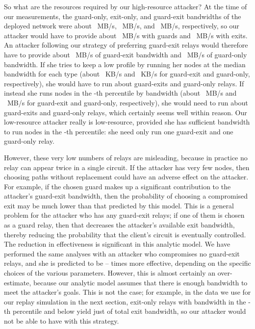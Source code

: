 \documentclass[]{lmcs}
\begin{document}
So what are the resources required by our high-resource attacker?
At the time of our measurements, the guard-only, exit-only, and guard-exit
bandwidths of the deployed
network were about ~MB/s, ~MB/s, and ~MB/s, respectively,
so our
attacker would have to provide about ~MB/s with guards
and ~MB/s with exits.  
An attacker following our strategy of preferring guard-exit relays
would therefore have to provide about
~MB/s of guard-exit bandwidth and ~MB/s of guard-only bandwidth.
If she tries to keep a
low profile by running her nodes at the median bandwidth for each
type (about ~KB/s and ~KB/s for guard-exit and
guard-only, respectively), she would have to run about
 guard-exits and  guard-only relays.
If instead she runs nodes in the -th percentile by bandwidth
(about ~MB/s and ~MB/s for guard-exit and guard-only, respectively),
she would need to run about
 guard-exits and  guard-only relays, which certainly seems
well within reason.
Our low-resource attacker really is low-resource, provided she
has sufficient bandwidth to run nodes in the -th percentile:
she need only run one guard-exit and one guard-only relay.

However, these very low numbers of relays are misleading, because in practice
no relay can appear twice in a single circuit.  If the attacker
has very few nodes, then choosing paths
without replacement could have an adverse effect on the attacker.
For example, if the chosen guard makes up a significant contribution
to the attacker's guard-exit bandwidth, then the probability of
choosing a compromised exit may be much lower than that
predicted by this model.  
This is a general problem for
the attacker who has any guard-exit relays; if one of them is chosen
as a guard relay, then that decreases the attacker's available exit
bandwidth, thereby reducing the probability that the client's
circuit is eventually controlled.  The reduction in effectiveness
is significant in this analytic model.  We have performed the same
analyses with an attacker who compromises no guard-exit
relays, and she is predicted to be -- times more effective,
depending on the specific choices of the various parameters.
However, this is almost certainly an over-estimate, because our
analytic model assumes that there is enough bandwidth to meet the
attacker's goals.  This is not the case; for example, in the
data we use for our replay simulation in the next section, exit-only
relays with bandwidth in the -th percentile and below yield
just  of total exit bandwidth, so our attacker would not be
able to have  with this strategy.
\end{document}

